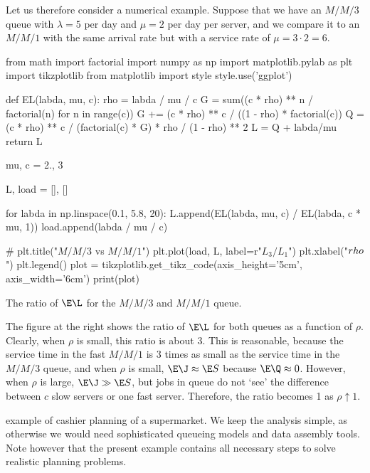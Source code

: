 Let us therefore consider a numerical example.
Suppose that we have an $M/M/3$ queue with $\lambda = 5$ per day and $\mu=2$ per day per server, and we compare it to an $M/M/1$ with the same arrival rate but with a service rate of $\mu = 3\cdot 2 = 6$.
\begin{marginfigure}
\begin{pycode}[ratio]
from math import factorial
import numpy as np
import matplotlib.pylab as plt
import tikzplotlib
from matplotlib import style
style.use('ggplot')


def EL(labda, mu, c):
    rho = labda / mu / c
    G = sum((c * rho) ** n / factorial(n) for n in range(c))
    G += (c * rho) ** c / ((1 - rho) * factorial(c))
    Q = (c * rho) ** c / (factorial(c) * G) * rho / (1 - rho) ** 2
    L = Q + labda/mu
    return L


mu, c = 2., 3

L, load = [], []

for labda in np.linspace(0.1, 5.8, 20):
    L.append(EL(labda, mu, c) / EL(labda, c * mu, 1))
    load.append(labda / mu / c)

# plt.title("$M/M/3$ vs $M/M/1$")
plt.plot(load, L, label=r"$L_3/L_1$")
plt.xlabel("$\\rho$")
plt.legend()
plot = tikzplotlib.get_tikz_code(axis_height='5cm',
                                 axis_width='6cm')
print(plot)
\end{pycode}
\caption{The ratio of $\E\L$ for the $M/M/3$ and $M/M/1$ queue.}
\label{fig:fast}
\end{marginfigure}

The figure at the right shows the ratio of $\E\L$ for both queues as a function of $\rho$.
Clearly, when $\rho$ is small, this ratio is about $3$.
This is reasonable, because the service time in the fast $M/M/1$ is 3 times as small as the service time in the $M/M/3$ queue, and when $\rho$ is small, $\E\J \approx \E S$ because $\E\Q \approx 0$.
However, when $\rho$ is large, $\E\J \gg \E S$, but jobs in queue do not `see' the difference between $c$ slow servers or one fast server. Therefore, the ratio becomes 1 as $\rho\uparrow 1$.


 example of cashier planning of a supermarket.
We keep the analysis simple, as otherwise we would need sophisticated queueing models and data assembly tools.
Note however that the present example contains all  necessary steps to solve realistic planning problems.


